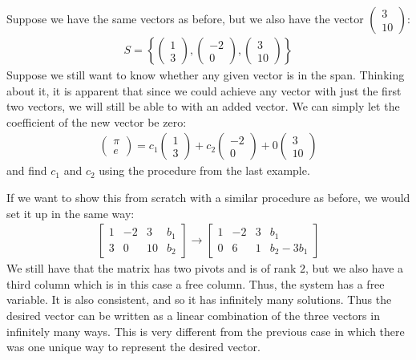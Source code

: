 \documentclass[11pt]{article}
\begin{document}
Suppose we have the same vectors as before, but we also have the vector $\begin{pmatrix}3\\10\end{pmatrix}$:
\begin{align*}
S = \left\{ \begin{pmatrix}1\\3\end{pmatrix}, \begin{pmatrix}-2\\0\end{pmatrix}, \begin{pmatrix}3\\10\end{pmatrix} \right\}
\end{align*}
Suppose we still want to know whether any given vector is in the span. Thinking about it, it is apparent that since we could achieve any vector with just the first two vectors, we will still be able to with an added vector. We can simply let the coefficient of the new vector be zero:
\begin{align*}
\begin{pmatrix}\pi\\e\end{pmatrix}
= c_1 \begin{pmatrix}1\\3\end{pmatrix} +
c_2 \begin{pmatrix}-2\\0\end{pmatrix} + 
0 \begin{pmatrix}3\\10\end{pmatrix}
\end{align*}
and find $c_1$ and $c_2$ using the procedure from the last example.

If we want to show this from scratch with a similar procedure as before, we would set it up in the same way:
\begin{align*}
\left[
\begin{matrix}
1 & -2 & 3 & b_1
\\
3 & 0 & 10 & b_2
\end{matrix}
\right]
\longrightarrow
\left[
\begin{matrix}
1 & -2 & 3 & b_1
\\
0 & 6 & 1 & b_2 - 3b_1
\end{matrix}
\right]
\end{align*}
We still have that the matrix has two pivots and is of rank $2$, but we also have a third column which is in this case a free column. Thus, the system has a free variable. It is also consistent, and so it has infinitely many solutions. Thus the desired vector can be written as a linear combination of the three vectors in infinitely many ways. This is very different from the previous case in which there was one unique way to represent the desired vector.
\end{document}
